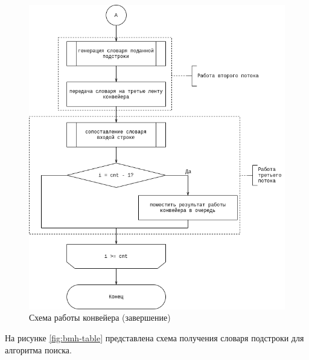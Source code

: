 \begin{center}
	\begin{figure}[H]
		\centering
		\includegraphics[width=0.75\linewidth]{assets/bmh_pipe-pipe-end.drawio.png}
		\caption{Схема работы конвейера (завершение)}
		\label{fig:pipeline-2}
	\end{figure}
\end{center}

На рисунке \ref{fig:bmh-table} представлена схема получения словаря подстроки для алгоритма поиска. 

